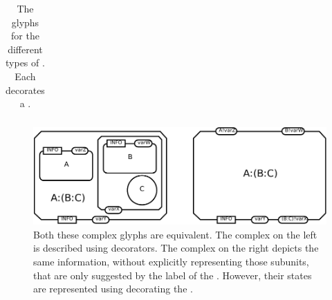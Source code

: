 \begin{table}[h]
\begin{tabu}{X[c,m]X[c,m]X[c,m]X[c,m]}
     & & & \\
    \bottomrule
\end{tabu}
\caption{The \PD glyphs for the different types of .
Each  decorates a .}
\label{tab:subunit_containers}
\end{table}

\begin{figure}[htb]
  \centering
  \includegraphics[scale=0.8]{images/build/complex.pdf}
  \caption{Both these complex glyphs are equivalent.
      The complex on the left is described using  decorators.
      The complex on the right depicts the same information, without explicitly representing those subunits, that are only suggested by the label of the .
      However, their states are represented using  decorating the .}
  \label{fig:complexSubunits}
\end{figure} 
